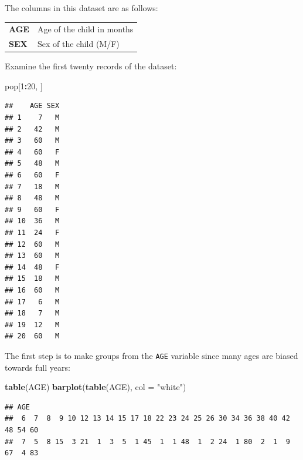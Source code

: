 \documentclass[12pt,]{book}
\newenvironment{Shaded}{\begin{snugshade}}{\end{snugshade}}
\newcommand{\KeywordTok}[1]{\textcolor[rgb]{0.13,0.29,0.53}{\textbf{#1}}}
\newcommand{\DataTypeTok}[1]{\textcolor[rgb]{0.13,0.29,0.53}{#1}}
\newcommand{\DecValTok}[1]{\textcolor[rgb]{0.00,0.00,0.81}{#1}}
\newcommand{\StringTok}[1]{\textcolor[rgb]{0.31,0.60,0.02}{#1}}
\newcommand{\OperatorTok}[1]{\textcolor[rgb]{0.81,0.36,0.00}{\textbf{#1}}}
\newcommand{\NormalTok}[1]{#1}
\theoremstyle{definition}
\theoremstyle{definition}
\theoremstyle{definition}
\theoremstyle{remark}
\begin{document}
The columns in this dataset are as follows:

\begin{longtable}[]{@{}ll@{}}
\toprule
\begin{minipage}[t]{0.14\columnwidth}\raggedright
\textbf{AGE}\strut
\end{minipage} & \begin{minipage}[t]{0.38\columnwidth}\raggedright
Age of the child in months\strut
\end{minipage}\tabularnewline
\begin{minipage}[t]{0.14\columnwidth}\raggedright
\textbf{SEX}\strut
\end{minipage} & \begin{minipage}[t]{0.38\columnwidth}\raggedright
Sex of the child (M/F)\strut
\end{minipage}\tabularnewline
\bottomrule
\end{longtable}

Examine the first twenty records of the dataset:

\begin{Shaded}
\begin{Highlighting}[]
\NormalTok{pop[}\DecValTok{1}\OperatorTok{:}\DecValTok{20}\NormalTok{, ]}
\end{Highlighting}
\end{Shaded}

\begin{verbatim}
##    AGE SEX
## 1    7   M
## 2   42   M
## 3   60   M
## 4   60   F
## 5   48   M
## 6   60   F
## 7   18   M
## 8   48   M
## 9   60   F
## 10  36   M
## 11  24   F
## 12  60   M
## 13  60   M
## 14  48   F
## 15  18   M
## 16  60   M
## 17   6   M
## 18   7   M
## 19  12   M
## 20  60   M
\end{verbatim}

The first step is to make groups from the \texttt{AGE} variable since
many ages are biased towards full years:

\begin{Shaded}
\begin{Highlighting}[]
\KeywordTok{table}\NormalTok{(AGE)}
\KeywordTok{barplot}\NormalTok{(}\KeywordTok{table}\NormalTok{(AGE), }\DataTypeTok{col =} \StringTok{"white"}\NormalTok{)}
\end{Highlighting}
\end{Shaded}

\begin{verbatim}
## AGE
##  6  7  8  9 10 12 13 14 15 17 18 22 23 24 25 26 30 34 36 38 40 42 48 54 60 
##  7  5  8 15  3 21  1  3  5  1 45  1  1 48  1  2 24  1 80  2  1  9 67  4 83
\end{verbatim}
\end{document}
